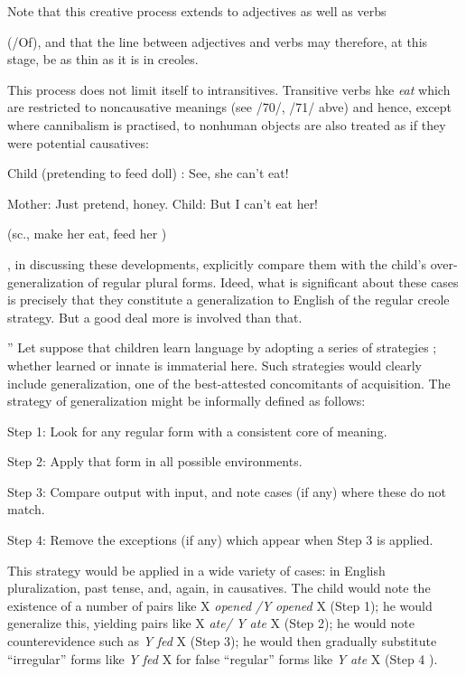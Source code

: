 Note that this creative process extends to adjectives as well as verbs

(/Of), and that the line between adjectives and verbs may therefore, at this stage, be as thin as it is in creoles.

This process does not limit itself to intransitives. Transitive verbs hke \textit{eat} which are restricted to noncausative meanings (see /70/, /71/ abve) and hence, except where cannibalism is practised, to nonhuman objects are also treated as if they were potential causatives:

\ea\label{ex:81}
 Child (pretending to feed doll) : See, she can't eat!

Mother: Just pretend, honey. Child: But I can't eat her!

(sc., make her eat, feed her )
\z

\citet[511]{ClarkEtAl1977}, in discussing these developments, explicitly compare them with the child's over-generalization of regular plural forms. Ideed, what is significant about these cases is precisely that they constitute a generalization to English of the regular creole strategy. But a good deal more is involved than that.

'' Let suppose that children learn language by adopting a series of strategies ; whether learned or innate is immaterial here. Such
strategies would clearly include generalization, one of the best-attested concomitants of acquisition. The strategy of generalization might be informally defined as follows:

Step 1: Look for any regular form with a consistent core of meaning.

Step 2: Apply that form in all possible environments.

Step 3: Compare output with input, and note cases (if any) where these do not match.

Step 4: Remove the exceptions (if any) which appear when Step 3 is applied.

This strategy would be applied in a wide variety of cases: in English pluralization, past tense, and, again, in causatives. The child would note the existence of a number of pairs like X \textit{opened} \textit{/Y} \textit{opened} X (Step 1); 
he would generalize this, yielding pairs like X \textit{ate}\textit{/} \textit{Y} \textit{ate} X (Step 2); 
he would note counterevidence such as \textit{Y} \textit{fed} X (Step 3);
he would then gradually substitute ``irregular'' forms like \textit{Y fed} X for false ``regular'' forms like \textit{Y} \textit{ate} X (Step 4 ).

